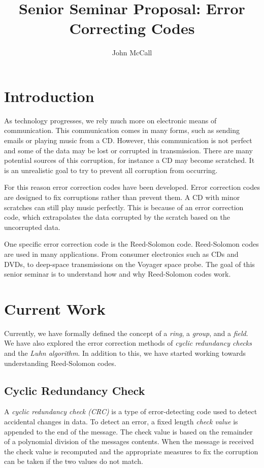 \documentclass{article}
\author{John McCall}
\title{Senior Seminar Proposal: Error Correcting Codes}
\begin{document}
\maketitle

\section{Introduction}
As technology progresses, we rely much more on electronic means of communication.
This communication comes in many forms, such as sending emails or playing music 
from a CD. However, this communication is not perfect and some of the data
may be lost or corrupted in transmission. There are many potential sources
of this corruption, for instance a CD may become scratched. It is an unrealistic
goal to try to prevent all corruption from occurring.

For this reason error correction codes have been developed. Error correction
codes are designed to fix corruptions rather than prevent them. A CD with
minor scratches can still play music perfectly. This is because of
an error correction code, which extrapolates the data corrupted by the
scratch based on the uncorrupted data.

One specific error correction code is the Reed-Solomon code. Reed-Solomon codes
are used in many applications. From consumer electronics such as CDs and DVDs,
to deep-space transmissions on the Voyager space probe. The goal of this
senior seminar is to understand how and why Reed-Solomon codes work. 

\section{Current Work}
Currently, we have formally defined the concept of a \textit{ring}, a \textit{group},
and a \textit{field}. We have also explored the error correction methods of
\textit{cyclic redundancy checks} and the \textit{Luhn algorithm}. In addition
to this, we have started working towards understanding Reed-Solomon codes.

\subsection{Cyclic Redundancy Check}
A \textit{cyclic redundancy check (CRC)} is a type of error-detecting code used to detect accidental changes in data.
To detect an error, a fixed length \textit{check value} is appended to the end of the message. The check value is
based on the remainder of a polynomial division of the messages contents. When the message is received the check value
is recomputed and the appropriate measures to fix the corruption can be taken if the two values do not match.
\end{document}
